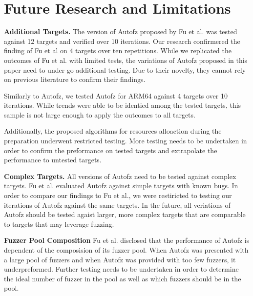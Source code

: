 \section{Future Research and Limitations}
\item \textbf{Additional Targets.} The version of Autofz proposed by Fu et al. 
was tested against 12 targets and verified over 10 iterations. Our research  
confirmered the finding of Fu et al on 4 targets over ten repetitions. While we 
replicated the outcomes of Fu et al. with limited tests, the variations 
of Autofz proposed in this paper need to under go additional testing. Due to their 
novelty, they cannot rely on previous literature to confirm their findings.

Similarly to Autofz, we tested Autofz for ARM64 against 4 targets over 10 
iterations. While trends were able to be identied among the tested targets, this
sample is not large enough to apply the outcomes to all targets. 

Additionally, the proposed algorithms for resources alloaction during the preparation
underwent restricted testing. More testing needs to be undertaken in order to confirm
the preformance on tested targets and extrapolate the performance to untested targets.

\item \textbf{Complex Targets.} All versions of Autofz need to be tested against 
complex targets. Fu et al. evaluated Autofz against simple targets with known bugs. In 
order to compare our findings to Fu et al., we were restiricted to testing our 
iterations of Autofz against the same targets. In the future, all veriations of 
Autofz should be tested agaist larger, more complex targets that are comparable to
targets that may leverage fuzzing.

\item \textbf{Fuzzer Pool Composition} Fu et al. disclosed that the performance of
Autofz is dependent of the composision of its fuzzer pool. When Autofz was presented
with a large pool of fuzzers and when Autofz was provided with too few fuzzers, it 
underpreformed. Further testing needs to be undertaken in order to determine the ideal
number of fuzzer in the pool as well as which fuzzers should be in the pool.